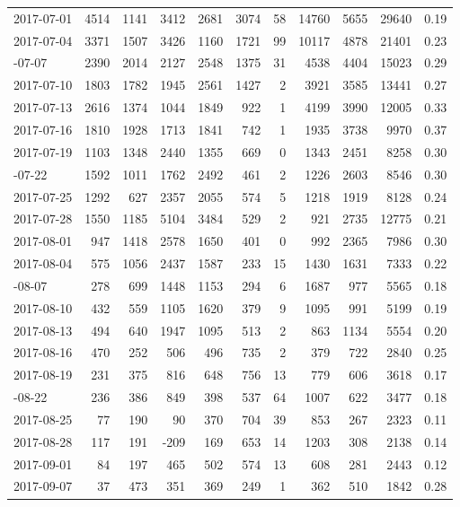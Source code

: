 \documentclass[
]{article}
\begin{document}
\begin{longtable}{lrrrrrrrrrr}
2017-07-01 & 4514 & 1141 & 3412 & 2681 & 3074 & 58 & 14760 & 5655 & 29640 & 0.19\\
2017-07-04 & 3371 & 1507 & 3426 & 1160 & 1721 & 99 & 10117 & 4878 & 21401 & 0.23\\
\addlinespace
2017-07-07 & 2390 & 2014 & 2127 & 2548 & 1375 & 31 & 4538 & 4404 & 15023 & 0.29\\
2017-07-10 & 1803 & 1782 & 1945 & 2561 & 1427 & 2 & 3921 & 3585 & 13441 & 0.27\\
2017-07-13 & 2616 & 1374 & 1044 & 1849 & 922 & 1 & 4199 & 3990 & 12005 & 0.33\\
2017-07-16 & 1810 & 1928 & 1713 & 1841 & 742 & 1 & 1935 & 3738 & 9970 & 0.37\\
2017-07-19 & 1103 & 1348 & 2440 & 1355 & 669 & 0 & 1343 & 2451 & 8258 & 0.30\\
\addlinespace
2017-07-22 & 1592 & 1011 & 1762 & 2492 & 461 & 2 & 1226 & 2603 & 8546 & 0.30\\
2017-07-25 & 1292 & 627 & 2357 & 2055 & 574 & 5 & 1218 & 1919 & 8128 & 0.24\\
2017-07-28 & 1550 & 1185 & 5104 & 3484 & 529 & 2 & 921 & 2735 & 12775 & 0.21\\
2017-08-01 & 947 & 1418 & 2578 & 1650 & 401 & 0 & 992 & 2365 & 7986 & 0.30\\
2017-08-04 & 575 & 1056 & 2437 & 1587 & 233 & 15 & 1430 & 1631 & 7333 & 0.22\\
\addlinespace
2017-08-07 & 278 & 699 & 1448 & 1153 & 294 & 6 & 1687 & 977 & 5565 & 0.18\\
2017-08-10 & 432 & 559 & 1105 & 1620 & 379 & 9 & 1095 & 991 & 5199 & 0.19\\
2017-08-13 & 494 & 640 & 1947 & 1095 & 513 & 2 & 863 & 1134 & 5554 & 0.20\\
2017-08-16 & 470 & 252 & 506 & 496 & 735 & 2 & 379 & 722 & 2840 & 0.25\\
2017-08-19 & 231 & 375 & 816 & 648 & 756 & 13 & 779 & 606 & 3618 & 0.17\\
\addlinespace
2017-08-22 & 236 & 386 & 849 & 398 & 537 & 64 & 1007 & 622 & 3477 & 0.18\\
2017-08-25 & 77 & 190 & 90 & 370 & 704 & 39 & 853 & 267 & 2323 & 0.11\\
2017-08-28 & 117 & 191 & -209 & 169 & 653 & 14 & 1203 & 308 & 2138 & 0.14\\
2017-09-01 & 84 & 197 & 465 & 502 & 574 & 13 & 608 & 281 & 2443 & 0.12\\
2017-09-07 & 37 & 473 & 351 & 369 & 249 & 1 & 362 & 510 & 1842 & 0.28\\

\end{longtable}
\end{document}

